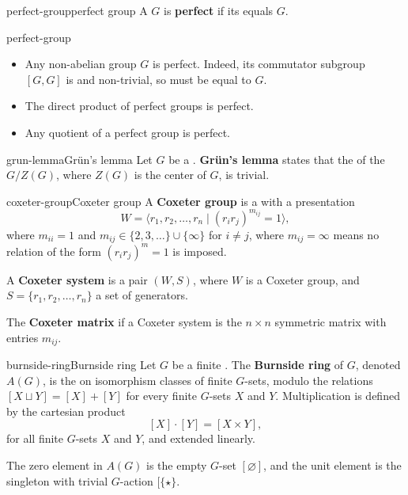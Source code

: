 \begin{topic}{perfect-group}{perfect group}
    A  $G$ is \textbf{perfect} if its  equals $G$.
\end{topic}

\begin{example}{perfect-group}
    \begin{itemize}
        \item Any non-abelian  group $G$ is perfect. Indeed, its commutator subgroup $[G, G]$ is  and non-trivial, so must be equal to $G$.
        \item The direct product of perfect groups is perfect.
        \item Any quotient of a perfect group is perfect.
    \end{itemize}
\end{example}

\begin{topic}{grun-lemma}{Grün's lemma}
    Let $G$ be a  . \textbf{Grün's lemma} states that the  of the  $G / Z(G)$, where $Z(G)$ is the center of $G$, is trivial.
\end{topic}

\begin{topic}{coxeter-group}{Coxeter group}
    A \textbf{Coxeter group} is a  with a presentation
    \[ W = \langle r_1, r_2, \ldots, r_n \mid (r_i r_j)^{m_{ij}} = 1 \rangle , \]
    where $m_{ii} = 1$ and $m_{ij} \in \{ 2, 3, \ldots \} \cup \{ \infty \}$ for $i \ne j$, where $m_{ij} = \infty$ means no relation of the form $(r_i r_j)^m = 1$ is imposed.
    
    A \textbf{Coxeter system} is a pair $(W, S)$, where $W$ is a Coxeter group, and $S = \{ r_1, r_2, \ldots, r_n \}$ a set of generators.
    
    The \textbf{Coxeter matrix} if a Coxeter system is the $n \times n$ symmetric matrix with entries $m_{ij}$.
\end{topic}

\begin{topic}{burnside-ring}{Burnside ring}
    Let $G$ be a finite . The \textbf{Burnside ring} of $G$, denoted $A(G)$, is the  on isomorphism classes of finite $G$-sets, modulo the relations $[X \sqcup Y] = [X] + [Y]$ for every finite $G$-sets $X$ and $Y$. Multiplication is defined by the cartesian product
    \[ [X] \cdot [Y] = [X \times Y] , \]
    for all finite $G$-sets $X$ and $Y$, and extended linearly.
    
    The zero element in $A(G)$ is the empty $G$-set $[\varnothing]$, and the unit element is the singleton with trivial $G$-action $[\{ \star \}$.
\end{topic}

